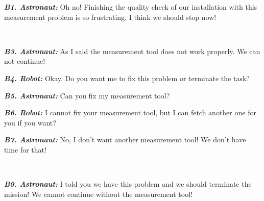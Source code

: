 \begin{spacing}{1.2}
\small{
\begin{description}
  \item \textit{\textbf{B1. Astronaut:}} Oh no! Finishing the quality check of
  our installation with this measurement problem is so frustrating. I think we
  should stop now!\\

  \item {}\\
  
  \item \textit{\textbf{B3. Astronaut:}} As I said the measurement tool does not
  work properly. We can not continue!\\

  \item \textit{\textbf{B4. Robot:}} Okay. Do you want me to fix this problem
  or terminate the task?\\

  \item \textit{\textbf{B5. Astronaut:}} Can you fix my measurement tool?\\
  
  \item \textit{\textbf{B6. Robot:}} I cannot fix your measurement tool, but I
  can fetch another one for you if you want?\\
  
  \item \textit{\textbf{B7. Astronaut:}} No, I don't want another measurement tool!
  We don't have time for that!\\
  
  \item {}\\
  
  \item \textit{\textbf{B9. Astronaut:}} I told you we have this problem and we
  should terminate the mission! We cannot continue without the measurement
  tool!
\end{description}
}
\end{spacing}

